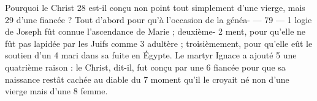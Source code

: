 Pourquoi le Christ	 
28	 	est-il conçu non point tout simplement d'une vierge, mais	 
29	 	d'une fiancée ? Tout d'abord pour qu'à l'occasion de la généa-	 
 	--- 79 ---	 
1	 	logie de Joseph fût connue l'ascendance de Marie ; deuxième-	 
2	 	ment, pour qu'elle ne fût pas lapidée par les Juifs comme	 
3	 	adultère ; troisièmement, pour qu'elle eût le soutien d'un	 
4	 	mari dans sa fuite en Égypte. Le martyr Ignace a ajouté	 
5	 	une quatrième raison : le Christ, dit-il, fut conçu par une	 
6	 	fiancée pour que sa naissance restât cachée au diable du	 
7	 	moment qu'il le croyait né non d'une vierge mais d'une	 
8	 	femme.